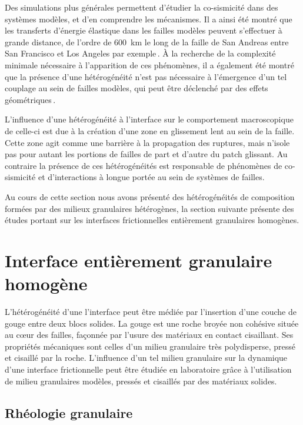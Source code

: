 Des simulations plus générales permettent d'étudier la co-sismicité dans des systèmes modèles, et d'en comprendre les mécanismes. Il a ainsi été montré que les transferts d'énergie élastique dans les failles modèles peuvent s'effectuer à grande distance, de l'ordre de \SI{600}{\kilo\meter} le long de la faille de San Andreas entre San Francisco et Los Angeles par exemple\,\cite{lui_repeating_2016}. À la recherche de la complexité minimale nécessaire à l’apparition de ces phénomènes, il a également été montré que la présence d'une hétérogénéité n'est pas nécessaire à l'émergence d'un tel couplage au sein de failles modèles, qui peut être déclenché par des effets géométriques\,\cite{romanet_fast_2018,liu_aseismic_2005}.


L'influence d'une hétérogénéité à l'interface sur le comportement macroscopique de celle-ci est due à la création d'une zone en glissement lent au sein de la faille. Cette zone agit comme une barrière à la propagation des ruptures, mais n'isole pas pour autant les portions de failles de part et d'autre du patch glissant. Au contraire la présence de ces hétérogénéités est responsable de phénomènes de co-sismicité et d'interactions à longue portée au sein de systèmes de failles.

Au cours de cette section nous avons présenté des hétérogénéités de composition formées par des milieux granulaires hétérogènes, la section suivante présente des études portant sur les interfaces frictionnelles entièrement granulaires homogènes.



\section{Interface entièrement granulaire homogène}

L'hétérogénéité d'une l'interface peut être médiée par l'insertion d'une couche de gouge entre deux blocs solides. La gouge est une roche broyée non cohésive située au cœur des failles, façonnée par l'usure des matériaux en contact cisaillant. Ses propriétés mécaniques sont celles d'un milieu granulaire très polydisperse, pressé et cisaillé par la roche. L'influence d'un tel milieu granulaire sur la dynamique d'une interface frictionnelle peut être étudiée en laboratoire grâce à l'utilisation de milieu granulaires modèles, pressés et cisaillés par des matériaux solides.


\subsection{Rhéologie granulaire}



